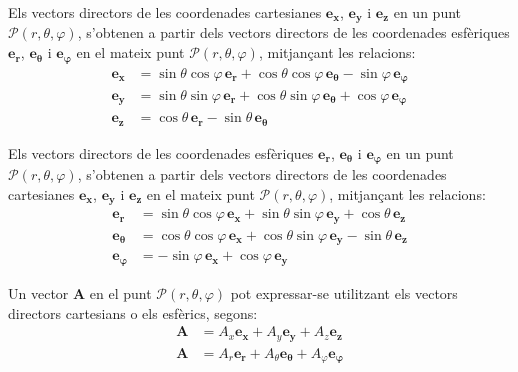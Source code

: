 \documentclass[catalan,a4paper,twoside,11pt]{article}
\begin{document}
Els vectors directors de les coordenades cartesianes  $\boldsymbol{e_x}$, $\boldsymbol{e_y}$ i $\boldsymbol{e_z}$ en un punt  $\mathscr{P}(r,\theta,\varphi)$, s'obtenen a partir dels vectors directors de les coordenades esfèriques $\boldsymbol{e_r}$, $\boldsymbol{e_\theta}$ i $\boldsymbol{e_\varphi}$ en el mateix punt $\mathscr{P}(r,\theta,\varphi)$, mitjançant les relacions:
\begin{subequations}\begin{align}
		\boldsymbol{e_x} &=\sin\theta\cos\varphi\,\boldsymbol{e_r}+
		\cos\theta\cos\varphi\,\boldsymbol{e_\theta}-\sin\varphi\,\boldsymbol{e_\varphi}\\
		\boldsymbol{e_y} &=\sin\theta\sin\varphi\,\boldsymbol{e_r}+
		\cos\theta\sin\varphi\,\boldsymbol{e_\theta}+\cos\varphi\,\boldsymbol{e_\varphi}\\
		\boldsymbol{e_z} &=\cos\theta\,\boldsymbol{e_r}-\sin\theta\,\boldsymbol{e_\theta}
\end{align}\end{subequations}


Els vectors directors de les coordenades esfèriques $\boldsymbol{e_r}$, $\boldsymbol{e_\theta}$ i $\boldsymbol{e_\varphi}$ en un punt $\mathscr{P}(r,\theta,\varphi)$, s'obtenen a partir dels vectors directors de les coordenades cartesianes $\boldsymbol{e_x}$, $\boldsymbol{e_y}$ i $\boldsymbol{e_z}$ en el mateix punt $\mathscr{P}(r,\theta,\varphi)$, mitjançant les relacions:
\begin{subequations}\begin{align}
    \boldsymbol{e_r} &=\sin\theta\cos\varphi\,\boldsymbol{e_x}+ \sin\theta\sin\varphi\,\boldsymbol{e_y}+\cos\theta\,\boldsymbol{e_z}\\
    \boldsymbol{e_\theta} &=\cos\theta\cos\varphi\,\boldsymbol{e_x}+
    \cos\theta\sin\varphi\,\boldsymbol{e_y}-\sin\theta\,\boldsymbol{e_z}\\
    \boldsymbol{e_\varphi}&=-\sin\varphi\,\boldsymbol{e_x}+\cos\varphi\,\boldsymbol{e_y}
\end{align}\end{subequations}

Un vector $\boldsymbol{A}$ en el punt $\mathscr{P}(r, \theta, \varphi)$  pot expressar-se utilitzant els vectors directors cartesians o els esfèrics, segons:
\begin{subequations}\begin{align}
		\boldsymbol{A} &= A_x \boldsymbol{e_x} + A_y \boldsymbol{e_y} + A_z \boldsymbol{e_z} \\
		\boldsymbol{A} &= A_r  \boldsymbol{e_r} + A_\theta \boldsymbol{e_\theta} + A_\varphi \boldsymbol{e_\varphi}
\end{align}\end{subequations}
\end{document}
